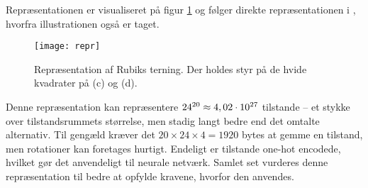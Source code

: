 \documentclass[../main.tex]{subfiles}
\begin{document}
Repræsentationen er visualiseret på figur \ref{fig:kuberepr} og følger direkte repræsentationen i \cite{HumansBeGone}, hvorfra illustrationen også er taget.
\begin{figure}
	\centering
	\texttt{[image: repr]}
	\caption{Repræsentation af Rubiks terning. Der holdes styr på de hvide kvadrater på (c) og (d). \cite{HumansBeGone}}\label{fig:kuberepr}
\end{figure}
Denne repræsentation kan repræsentere $ 24^{20}\approx 4,02\cdot10^{27} $ tilstande -- et stykke over tilstandsrummets størrelse, men stadig langt bedre end det omtalte alternativ.
Til gengæld kræver det $ 20\times 24\times 4=1920 $ bytes at gemme en tilstand, men rotationer kan foretages hurtigt.
Endeligt er tilstande one-hot encodede, hvilket gør det anvendeligt til neurale netværk.
Samlet set vurderes denne repræsentation til bedre at opfylde kravene, hvorfor den anvendes.
\end{document}
